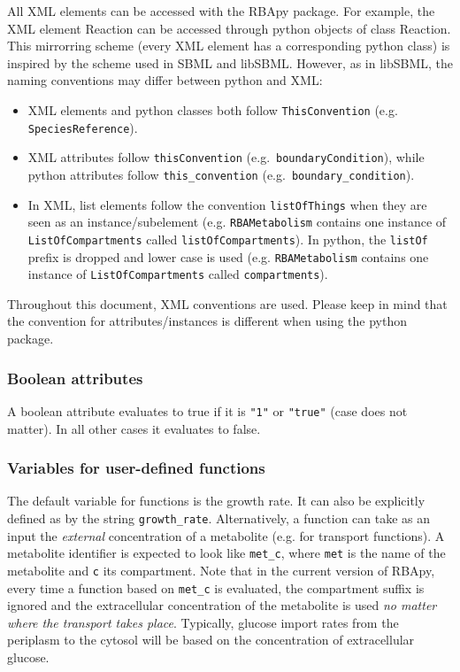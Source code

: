 \documentclass[12pt]{scrartcl}
\begin{document}
All XML elements can be accessed with the RBApy package.
For example, the XML element Reaction can be accessed through python objects
of class Reaction.
This mirrorring scheme (every XML element has a corresponding python class) is
inspired by the scheme used in SBML and libSBML.
However, as in libSBML, the naming conventions may differ between python and XML:

\begin{itemize}
  \item XML elements and python classes both follow \texttt{ThisConvention} (e.g. \texttt{SpeciesReference}).
  \item XML attributes follow \texttt{thisConvention} (e.g.\ \texttt{boundaryCondition}), while
    python attributes follow \texttt{this\_convention} (e.g.\ \texttt{boundary\_condition}).
  \item In XML, list elements follow the convention \texttt{listOfThings}
    when they are seen as an instance/subelement
    (e.g. \texttt{RBAMetabolism} contains one instance of \texttt{ListOfCompartments} called \texttt{listOfCompartments}).
    In python, the \texttt{listOf} prefix is dropped and lower case is used
    (e.g. \texttt{RBAMetabolism} contains one instance of \texttt{ListOfCompartments} called \texttt{compartments}).
\end{itemize}

Throughout this document, XML conventions are used.
Please keep in mind that the convention for attributes/instances is different when using the
python package.

\subsubsection{Boolean attributes}

A boolean attribute evaluates to true if it is \texttt{"1"}
or \texttt{"true"} (case does not matter).
In all other cases it evaluates to false.

\subsubsection{Variables for user-defined functions}

The default variable for functions is the growth rate.
It can also be explicitly defined as by the string \texttt{growth\_rate}.
Alternatively, a function can take as an input the \emph{external}
concentration of a metabolite (e.g. for transport functions).
A metabolite identifier is expected to look like \texttt{met\_c},
where \texttt{met} is the name of the metabolite
and \texttt{c} its compartment.
Note that in the current version of RBApy,
every time a function based on \texttt{met\_c} is evaluated,
the compartment suffix is ignored and the extracellular concentration of the metabolite is used
\emph{no matter where the transport takes place}.
Typically, glucose import rates from the periplasm to the cytosol
will be based on the concentration of extracellular glucose.
\end{document}
